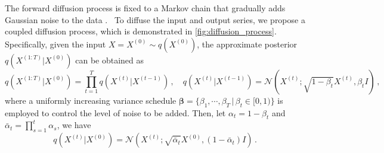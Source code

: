 The forward diffusion process is fixed to a Markov chain that gradually adds Gaussian noise to the data \cite{sohl2015deep,ho2020denoising}.~%
To diffuse the input and output series, we propose a coupled diffusion process, which is demonstrated in \cref{fig:diffusion_process}.~%
Specifically, given the input  $X = X^{(0)} \sim q(X^{(0)})$, the approximate posterior $q(X^{(1:T)}|X^{(0)})$  can be obtained as 
\begin{equation}
    q(X^{(1:T)}|X^{(0)}) = \prod_{t=1}^{T} q(X^{(t)}|X^{(t-1)})\, , \quad 
    q(X^{(t)}|X^{(t-1)}) = \mathcal{N} (X^{(t)}; \sqrt{1 - \beta_t} X^{(t)}, \beta_t I) \, ,
\end{equation}
where a uniformly increasing 
variance schedule $ \bm{\beta} = \{\beta_1, \cdots, \beta_{T} \, | \, \beta_t \in [0, 1) \} $  is employed to control the level of noise to be added. 
Then, let $ \alpha_t = 1 - \beta_t$ and $\bar{\alpha}_t = \prod_{s=1}^{t}\alpha_s$, we have
\begin{equation}    \label{diff}
    q(X^{(t)}|X^{(0)}) = \mathcal{N} ( X^{(t)}; \sqrt{\bar{\alpha}_t} X^{(0)}, (1 - \bar{\alpha}_t) I) \, .
\end{equation}

